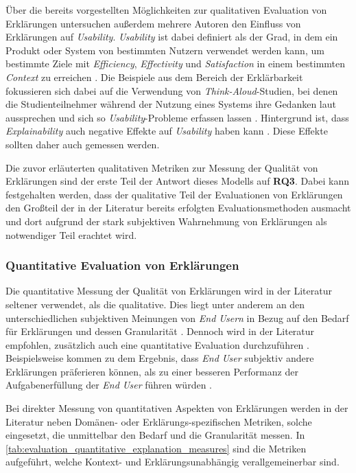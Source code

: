 Über die bereits vorgestellten Möglichkeiten zur qualitativen Evaluation von Erklärungen untersuchen außerdem mehrere Autoren den Einfluss von Erklärungen auf \textit{Usability}. \textit{Usability} ist dabei definiert als der \glqq Grad, in dem ein Produkt oder System von bestimmten Nutzern verwendet werden kann, um bestimmte Ziele mit \textit{Efficiency}, \textit{Effectivity} und \textit{Satisfaction} in einem bestimmten \textit{Context} zu erreichen \grqq{} \cite[übersetzt vgl.][]{international2011iso}. Die Beispiele aus dem Bereich der Erklärbarkeit fokussieren sich dabei auf die Verwendung von \textit{Think-Aloud}-Studien, bei denen die Studienteilnehmer während der Nutzung eines Systems ihre Gedanken laut aussprechen und sich so \textit{Usability}-Probleme erfassen lassen \cite{wiegand_id_2020, yamada_evaluating_2016}. Hintergrund ist, dass \textit{Explainability} auch negative Effekte auf \textit{Usability} haben kann \cite{chazette_knowledge_nodate}. Diese Effekte sollten daher auch gemessen werden.

\bigskip

Die zuvor erläuterten qualitativen Metriken zur Messung der Qualität von Erklärungen sind der erste Teil der Antwort dieses Modells auf \textbf{RQ3}. Dabei kann festgehalten werden, dass der qualitative Teil der Evaluationen von Erklärungen den Großteil der in der Literatur bereits erfolgten Evaluationsmethoden ausmacht und dort aufgrund der stark subjektiven Wahrnehmung von Erklärungen als notwendiger Teil erachtet wird.

\subsubsection{Quantitative Evaluation von Erklärungen}

Die quantitative Messung der Qualität von Erklärungen wird in der Literatur seltener verwendet, als die qualitative. Dies liegt unter anderem an den unterschiedlichen subjektiven Meinungen von \textit{End Usern} in Bezug auf den Bedarf für Erklärungen und dessen Granularität \cite{chazette_end-users_nodate, kouki_user_2017}. Dennoch wird in der Literatur empfohlen, zusätzlich auch eine quantitative Evaluation durchzuführen \cite{balog_measuring_2020}. Beispielsweise kommen \citeauthor{wiegand2019drive} zu dem Ergebnis, dass \textit{End User} subjektiv andere Erklärungen präferieren können, als zu einer besseren Performanz der Aufgabenerfüllung der \textit{End User} führen würden \cite{wiegand2019drive}.

Bei direkter Messung von quantitativen Aspekten von Erklärungen werden in der Literatur neben Domänen- oder Erklärungs-spezifischen Metriken, solche eingesetzt, die unmittelbar den Bedarf und die Granularität messen. In \autoref{tab:evaluation_quantitative_explanation_measures} sind die Metriken aufgeführt, welche Kontext- und Erklärungsunabhängig verallgemeinerbar sind.

